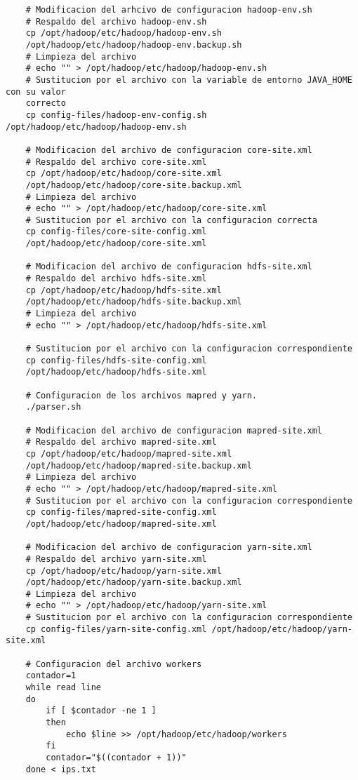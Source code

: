 \begin{lstlisting}
	# Modificacion del arhcivo de configuracion hadoop-env.sh
	# Respaldo del archivo hadoop-env.sh
	cp /opt/hadoop/etc/hadoop/hadoop-env.sh 
	/opt/hadoop/etc/hadoop/hadoop-env.backup.sh 
	# Limpieza del archivo
	# echo "" > /opt/hadoop/etc/hadoop/hadoop-env.sh
	# Sustitucion por el archivo con la variable de entorno JAVA_HOME con su valor 
	correcto
	cp config-files/hadoop-env-config.sh /opt/hadoop/etc/hadoop/hadoop-env.sh

	# Modificacion del archivo de configuracion core-site.xml
	# Respaldo del archivo core-site.xml
	cp /opt/hadoop/etc/hadoop/core-site.xml 
	/opt/hadoop/etc/hadoop/core-site.backup.xml
	# Limpieza del archivo 
	# echo "" > /opt/hadoop/etc/hadoop/core-site.xml
	# Sustitucion por el archivo con la configuracion correcta
	cp config-files/core-site-config.xml 
	/opt/hadoop/etc/hadoop/core-site.xml

	# Modificacion del archivo de configuracion hdfs-site.xml
	# Respaldo del archivo hdfs-site.xml
	cp /opt/hadoop/etc/hadoop/hdfs-site.xml 
	/opt/hadoop/etc/hadoop/hdfs-site.backup.xml
	# Limpieza del archivo
	# echo "" > /opt/hadoop/etc/hadoop/hdfs-site.xml

	# Sustitucion por el archivo con la configuracion correspondiente
	cp config-files/hdfs-site-config.xml 
	/opt/hadoop/etc/hadoop/hdfs-site.xml

	# Configuracion de los archivos mapred y yarn.
	./parser.sh

	# Modificacion del archivo de configuracion mapred-site.xml
	# Respaldo del archivo mapred-site.xml
	cp /opt/hadoop/etc/hadoop/mapred-site.xml 
	/opt/hadoop/etc/hadoop/mapred-site.backup.xml
	# Limpieza del archivo
	# echo "" > /opt/hadoop/etc/hadoop/mapred-site.xml
	# Sustitucion por el archivo con la configuracion correspondiente
	cp config-files/mapred-site-config.xml 
	/opt/hadoop/etc/hadoop/mapred-site.xml

	# Modificacion del archivo de configuracion yarn-site.xml
	# Respaldo del archivo yarn-site.xml
	cp /opt/hadoop/etc/hadoop/yarn-site.xml 
	/opt/hadoop/etc/hadoop/yarn-site.backup.xml
	# Limpieza del archivo
	# echo "" > /opt/hadoop/etc/hadoop/yarn-site.xml
	# Sustitucion por el archivo con la configuracion correspondiente
	cp config-files/yarn-site-config.xml /opt/hadoop/etc/hadoop/yarn-site.xml

	# Configuracion del archivo workers
	contador=1
	while read line
	do
		if [ $contador -ne 1 ]
		then
			echo $line >> /opt/hadoop/etc/hadoop/workers
		fi
		contador="$((contador + 1))"
	done < ips.txt


\end{lstlisting}
